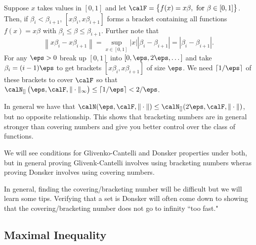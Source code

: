 \begin{example}
	\label{ex:brackering}
	Suppose \(x\) takes values in  \([0,1]\) and let \(\calF = \left\{f(x)=x\beta,\text{ for }\beta \in [0,1]\right\}\). Then, if \(\beta_i < \beta_{i+1}\),  \([x\beta_i, x\beta_{i+1}]\) forms a bracket containing all functions  \(f(x)=x\beta\) with  \(\beta_i \leq \beta\leq \beta_{i+1}\). Further note that \[
		\left\|x\beta_i - x\beta_{i+1}\right\| = \sup_{x\in[0,1]}|x||\beta_i-\beta_{i+1}| = |\beta_i -\beta_{i+1}|
	.\] 
	For any \(\eps>0\) break up  \([0,1]\) into  \([0,\eps,2\eps,\dots]\) and take \(\beta_i = (i-1)\eps\) to get brackets  \([x\beta_i,x\beta_{i+1}]\) of size \(\eps\). We need  \(\lceil 1/\eps\rceil\) of these brackets to cover  \(\calF\) so that  \(\calN_{[]}\left(\eps,\calF,\|\cdot\|_\infty\right)\leq \lceil 1/\eps\rceil < 2/\eps\).
\end{example}

\begin{remark}
    \label{rem:bracketing-covering}
	In general we have that \(\calN(\eps,\calF,\|\cdot\|)\leq \calN_{[]}(2\eps,\calF,\|\cdot\|)\), but no opposite relationship. This shows that bracketing numbers are in general stronger than covering numbers and give you better control over the class of functions. 

	We will see conditions for Glivenko-Cantelli and Donsker properties under both, but in general proving Glivenk-Cantelli involves using bracketing numbers wheras proving Donsker involves using covering numbers.
\end{remark}


In general, finding the covering/bracketing number will be difficult but we will learn some tips. Verifying that a set is Donsker will often come down to showing that the covering/bracketing number does not go to infinity ``too fast." 

\subsection{Maximal Inequality}%
\label{subsec:maximal}

